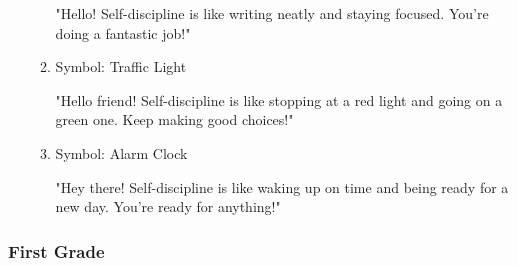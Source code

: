 \documentclass[14pt, letterpaper, twoside]{article}
\begin{document}
\begin{itemize}
\begin{enumerate}
		"Hello! Self-discipline is like writing neatly and staying focused. You're doing a
		fantastic job!"
		\item Symbol: Traffic Light 
		
		"Hello friend! Self-discipline is like stopping at a red light and going on a
		green one. Keep making good choices!"
		\item Symbol: Alarm Clock 
		
		"Hey there! Self-discipline is like waking up on time and being ready for a new
		day. You're ready for anything!"
		\end{enumerate}
	\end{itemize}
\pagebreak	
	\subsubsection{First Grade} 
\end{document}
